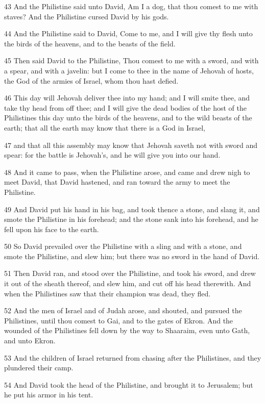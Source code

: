 \par 43 And the Philistine said unto David, Am I a dog, that thou comest to me with staves? And the Philistine cursed David by his gods.
\par 44 And the Philistine said to David, Come to me, and I will give thy flesh unto the birds of the heavens, and to the beasts of the field.
\par 45 Then said David to the Philistine, Thou comest to me with a sword, and with a spear, and with a javelin: but I come to thee in the name of Jehovah of hosts, the God of the armies of Israel, whom thou hast defied.
\par 46 This day will Jehovah deliver thee into my hand; and I will smite thee, and take thy head from off thee; and I will give the dead bodies of the host of the Philistines this day unto the birds of the heavens, and to the wild beasts of the earth; that all the earth may know that there is a God in Israel,
\par 47 and that all this assembly may know that Jehovah saveth not with sword and spear: for the battle is Jehovah's, and he will give you into our hand.
\par 48 And it came to pass, when the Philistine arose, and came and drew nigh to meet David, that David hastened, and ran toward the army to meet the Philistine.
\par 49 And David put his hand in his bag, and took thence a stone, and slang it, and smote the Philistine in his forehead; and the stone sank into his forehead, and he fell upon his face to the earth.
\par 50 So David prevailed over the Philistine with a sling and with a stone, and smote the Philistine, and slew him; but there was no sword in the hand of David.
\par 51 Then David ran, and stood over the Philistine, and took his sword, and drew it out of the sheath thereof, and slew him, and cut off his head therewith. And when the Philistines saw that their champion was dead, they fled.
\par 52 And the men of Israel and of Judah arose, and shouted, and pursued the Philistines, until thou comest to Gai, and to the gates of Ekron. And the wounded of the Philistines fell down by the way to Shaaraim, even unto Gath, and unto Ekron.
\par 53 And the children of Israel returned from chasing after the Philistines, and they plundered their camp.
\par 54 And David took the head of the Philistine, and brought it to Jerusalem; but he put his armor in his tent.
